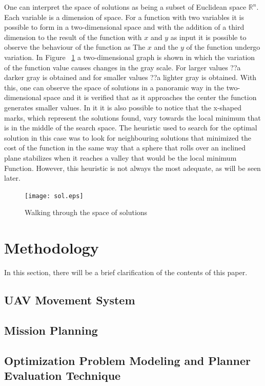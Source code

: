 \documentclass[conference,harvard,brazil,english]{sbatex}
\newcommand{\R}{\mathbb R}
\begin{document}
	One can interpret the space of solutions as being a subset of Euclidean space \(\R^n\). Each variable is a dimension of space. For a function with two variables it is possible to form in a two-dimensional space and with the addition of a third dimension to the result of the function with \(x\) and \(y\) as input it is possible to observe the behaviour of the function as The \(x\) and the \(y\) of the function undergo variation. In Figure ~\ref{fig:sol} a two-dimensional graph is shown in which the variation of the function value causes changes in the gray scale. For larger values ??a darker gray is obtained and for smaller values ??a lighter gray is obtained. With this, one can observe the space of solutions in a panoramic way in the two-dimensional space and it is verified that as it approaches the center the function generates smaller values. In it it is also possible to notice that the x-shaped marks, which represent the solutions found, vary towards the local minimum that is in the middle of the search space. The heuristic used to search for the optimal solution in this case was to look for neighbouring solutions that minimized the cost of the function in the same way that a sphere that rolls over an inclined plane stabilizes when it reaches a valley that would be the local minimum Function. However, this heuristic is not always the most adequate, as will be seen later.

\begin{figure}[H]
	\centering
	\texttt{[image: sol.eps]}
	\caption{Walking through the space of solutions\label{fig:sol}}
\end{figure}

\section{Methodology}

	In this section, there will be a brief clarification of the contents of this paper.
\subsection{UAV Movement System}



\subsection{Mission Planning}
\label{mission}

\subsection{Optimization Problem Modeling and Planner Evaluation Technique}
\label{modelo}
\end{document}
